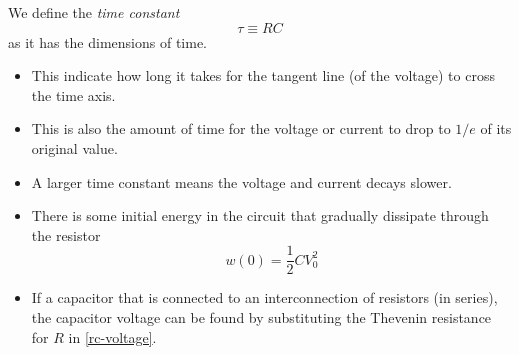 \documentclass{article}
\begin{document}
\begin{definition}
    We define the \textit{time constant}
    \begin{equation}
        \tau\equiv RC
    \end{equation}
    as it has the dimensions of time.
\end{definition}
\begin{itemize}
    \item This indicate how long it takes for the tangent line (of the voltage) to cross the time axis.
    \item This is also the amount of time for the voltage or current to drop to $1/e$ of its original value.
    \item A larger time constant means the voltage and current decays slower.
    \item There is some initial energy in the circuit that gradually dissipate through the resistor 
    \begin{equation}
        w(0)=\frac{1}{2}CV_0^2
    \end{equation}
    \item If a capacitor that is connected to an interconnection of resistors (in series), the capacitor voltage can be found by substituting the Thevenin resistance for $R$ in \eqref{rc-voltage}.
\end{itemize}




\end{document}
